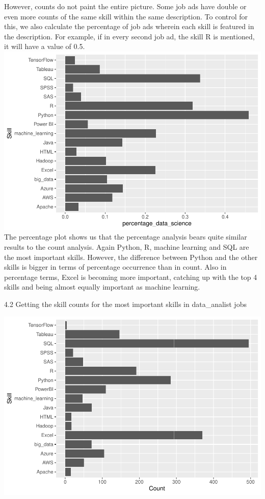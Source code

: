 \documentclass[
]{article}
\begin{document}
However, counts do not paint the entire picture. Some job ads have
double or even more counts of the same skill within the same
description. To control for this, we also calculate the percentage of
job ads wherein each skill is featured in the description. For example,
if in every second job ad, the skill R is mentioned, it will have a
value of 0.5.\\
\includegraphics{analysis_files/figure-latex/unnamed-chunk-14-1.pdf} The
percentage plot shows us that the percentage analysis bears quite
similar results to the count analysis. Again Python, R, machine learning
and SQL are the most important skills. However, the difference between
Python and the other skills is bigger in terms of percentage occurrence
than in count. Also in percentage terms, Excel is becoming more
important, catching up with the top 4 skills and being almost equally
important as machine learning.

4.2 Getting the skill counts for the most important skills in
data\_analist jobs

\includegraphics{analysis_files/figure-latex/unnamed-chunk-16-1.pdf}
\end{document}
